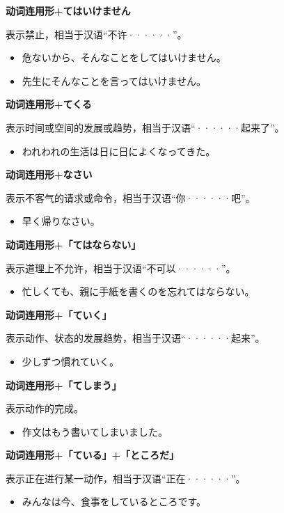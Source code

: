 {\bf
\noindent 动词连用形+てはいけません
}

表示禁止，相当于汉语``不许······''。
\begin{itemize}
  \item 危ないから、そんなことをしてはいけません。
  \item 先生にそんなことを言ってはいけません。
\end{itemize}

{\bf
\noindent 动词连用形+てくる
}

表示时间或空间的发展或趋势，相当于汉语``······起来了''。
\begin{itemize}
  \item われわれの生活は日に日によくなってきた。
\end{itemize}

{\bf
\noindent 动词连用形+なさい
}

表示不客气的请求或命令，相当于汉语``你······吧''。
\begin{itemize}
  \item 早く帰りなさい。
\end{itemize}

{\bf
\noindent 动词连用形+「てはならない」
}

表示道理上不允许，相当于汉语``不可以······''。
\begin{itemize}
  \item 忙しくても、親に手紙を書くのを忘れてはならない。
\end{itemize}

{\bf
\noindent 动词连用形+「ていく」
}

表示动作、状态的发展趋势，相当于汉语``······起来''。
\begin{itemize}
  \item 少しずつ慣れていく。
\end{itemize}

{\bf
\noindent 动词连用形+「てしまう」
}

表示动作的完成。
\begin{itemize}
  \item 作文はもう書いてしまいました。
\end{itemize}

{\bf
\noindent 动词连用形+「ている」+「ところだ」
}

表示正在进行某一动作，相当于汉语``正在······''。
\begin{itemize}
  \item みんなは今、食事をしているところです。
\end{itemize}

